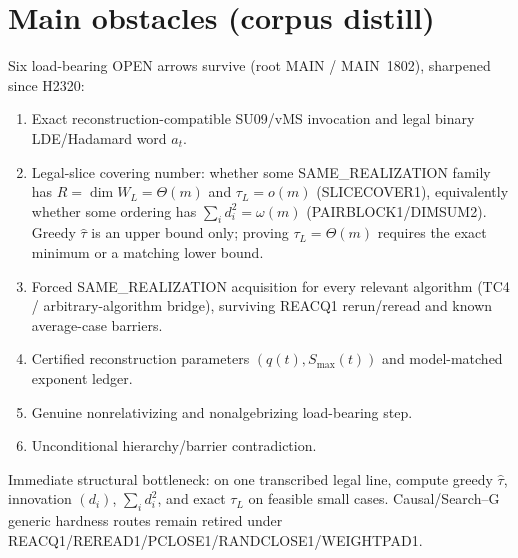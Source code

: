 \documentclass[11pt]{article}
\begin{document}
\section*{Main obstacles (corpus distill)}
Six load-bearing OPEN arrows survive (root MAIN / MAIN~1802), sharpened since H2320:
\begin{enumerate}
\item Exact reconstruction-compatible SU09/vMS invocation and legal binary LDE/Hadamard word $a_t$.
\item Legal-slice covering number: whether some SAME\_REALIZATION family has
$R=\dim W_L=\Theta(m)$ and $\tau_L=o(m)$ (SLICECOVER1), equivalently whether some ordering
has $\sum_i d_i^2=\omega(m)$ (PAIRBLOCK1/DIMSUM2). Greedy $\widehat\tau$ is an upper bound
only; proving $\tau_L=\Theta(m)$ requires the exact minimum or a matching lower bound.
\item Forced SAME\_REALIZATION acquisition for every relevant algorithm (TC4 / arbitrary-algorithm
bridge), surviving REACQ1 rerun/reread and known average-case barriers.
\item Certified reconstruction parameters $(q(t),S_{\max}(t))$ and model-matched exponent ledger.
\item Genuine nonrelativizing and nonalgebrizing load-bearing step.
\item Unconditional hierarchy/barrier contradiction.
\end{enumerate}
Immediate structural bottleneck: on one transcribed legal line, compute greedy $\widehat\tau$,
innovation $(d_i)$, $\sum_i d_i^2$, and exact $\tau_L$ on feasible small cases.
Causal/Search--G generic hardness routes remain retired under REACQ1/REREAD1/PCLOSE1/RANDCLOSE1/WEIGHTPAD1.
\end{document}

